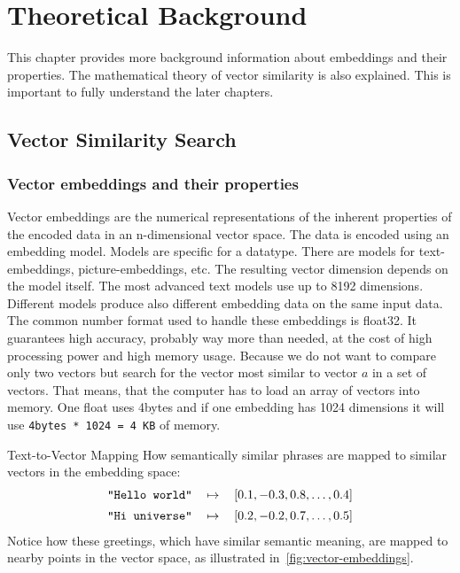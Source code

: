 \chapter{Theoretical Background}
\label{chapter:kap2}

This chapter provides more background information about embeddings and their properties.
The mathematical theory of vector similarity is also explained.
This is important to fully understand the later chapters.

\section{Vector Similarity Search}
\subsection{Vector embeddings and their properties}
Vector embeddings are the numerical representations of the inherent properties of the encoded data in an n-dimensional vector space.
The data is encoded using an embedding model. Models are specific for a datatype.
There are models for text-embeddings, picture-embeddings, etc.
The resulting vector dimension depends on the model itself. The most advanced text models use up to 8192 dimensions.~\cite{muennighoff2023mtebmassivetextembedding}
Different models produce also different embedding data on the same input data.
The common number format used to handle these embeddings is float32. It guarantees high accuracy, probably way more than needed,
at the cost of high processing power and high memory usage.
Because we do not want to compare only two vectors but search for the vector most similar to vector $a$ in a set of vectors.
That means, that the computer has to load an array of vectors into memory. One float uses 4bytes and if one embedding has 1024 dimensions
it will use \texttt{4bytes * 1024 = 4 KB} of memory.
\begin{example}{Text-to-Vector Mapping}{}
    \noindent How semantically similar phrases are mapped to similar vectors in the embedding space:
    \[
        \begin{tabular}{rcl}
            \texttt{"Hello world"} & $\mapsto$ & $[0.1, -0.3, 0.8, \ldots, 0.4]$ \\[0.5em]
            \texttt{"Hi universe"} & $\mapsto$ & $[0.2, -0.2, 0.7, \ldots, 0.5]$ \\
        \end{tabular}
    \]
    Notice how these greetings, which have similar semantic meaning, are mapped to nearby points in the vector space, as illustrated in~\autoref{fig:vector-embeddings}.
\end{example}

